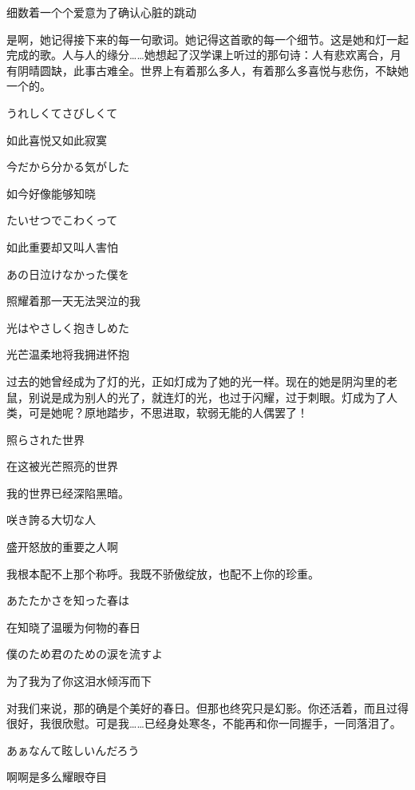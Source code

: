 \documentclass{article}
\begin{document}
细数着一个个爱意为了确认心脏的跳动



是啊，她记得接下来的每一句歌词。她记得这首歌的每一个细节。这是她和灯一起完成的歌。人与人的缘分……她想起了汉学课上听过的那句诗：人有悲欢离合，月有阴晴圆缺，此事古难全。世界上有着那么多人，有着那么多喜悦与悲伤，不缺她一个的。



うれしくてさびしくて

如此喜悦又如此寂寞

今だから分かる気がした

如今好像能够知晓

たいせつでこわくって

如此重要却又叫人害怕

あの日泣けなかった僕を

照耀着那一天无法哭泣的我

光はやさしく抱きしめた

光芒温柔地将我拥进怀抱



过去的她曾经成为了灯的光，正如灯成为了她的光一样。现在的她是阴沟里的老鼠，别说是成为别人的光了，就连灯的光，也过于闪耀，过于刺眼。灯成为了人类，可是她呢？原地踏步，不思进取，软弱无能的人偶罢了！



照らされた世界

在这被光芒照亮的世界



我的世界已经深陷黑暗。



咲き誇る大切な人

盛开怒放的重要之人啊



我根本配不上那个称呼。我既不骄傲绽放，也配不上你的珍重。



あたたかさを知った春は

在知晓了温暖为何物的春日

僕のため君のための涙を流すよ

为了我为了你这泪水倾泻而下



对我们来说，那的确是个美好的春日。但那也终究只是幻影。你还活着，而且过得很好，我很欣慰。可是我……已经身处寒冬，不能再和你一同握手，一同落泪了。



あぁなんて眩しいんだろう

啊啊是多么耀眼夺目
\end{document}

